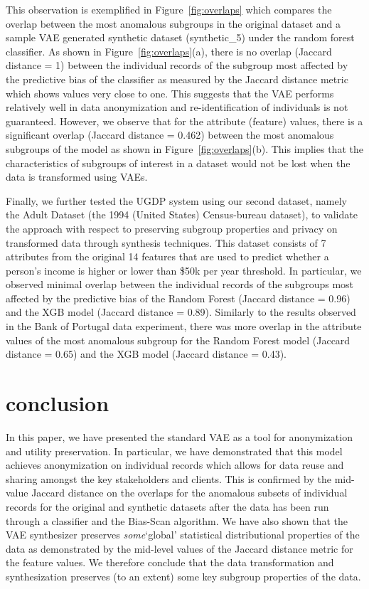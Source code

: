 \documentclass[dvipdft]{article}
\begin{document}
This observation is exemplified in Figure~\ref{fig:overlaps} which compares the overlap between the most anomalous subgroups in the original dataset and a sample VAE generated synthetic dataset (synthetic\_5) under the random forest classifier. As shown in Figure~\ref{fig:overlaps}(a), there is no overlap (Jaccard distance = 1) between the individual records of the subgroup most affected by the predictive bias of the classifier as measured by the Jaccard distance metric which shows values very close to one. This suggests that the VAE performs relatively well in data anonymization and re-identification of individuals is not guaranteed. %
However, we observe that for the attribute (feature) values, there is a significant overlap (Jaccard distance = 0.462) between the most anomalous subgroups of the model as shown in Figure~\ref{fig:overlaps}(b). This implies that the characteristics of subgroups of interest in a dataset would not be lost when the data is transformed using VAEs.


Finally, we further tested the UGDP system using our second dataset, namely the Adult Dataset \cite{USAdult} (the 1994 (United States) Census-bureau dataset), to validate the approach with respect to preserving subgroup properties and privacy on transformed data through synthesis techniques.
This dataset consists of 7 attributes from the original 14 features that are used to predict whether a person's income is higher or lower than \$50k per year threshold. In particular, we observed minimal overlap between the individual records of the subgroups most affected by the predictive bias of the Random Forest (Jaccard distance = 0.96) and the XGB model (Jaccard distance = 0.89). Similarly to the results observed in the Bank of Portugal data experiment, there was more overlap in the attribute values of the most anomalous subgroup for the Random Forest model (Jaccard distance = 0.65) and the XGB model (Jaccard distance = 0.43).


\section{conclusion}\label{sec.conclusion}

In this paper, we have presented the standard VAE as a tool for anonymization and utility preservation. In particular, we have demonstrated that this model achieves anonymization on individual records which allows for data reuse and sharing amongst the key stakeholders and clients. This is confirmed by the mid-value Jaccard distance on the overlaps for the anomalous subsets of individual records for the original and synthetic datasets after the data has been run through a classifier and the Bias-Scan algorithm. We have also shown that the VAE synthesizer preserves \textit{some}`global' statistical distributional properties of the data as demonstrated by the mid-level values of the Jaccard distance metric for the feature values. We therefore conclude that the data transformation and synthesization preserves (to an extent) some key subgroup properties of the data.   
\end{document}
